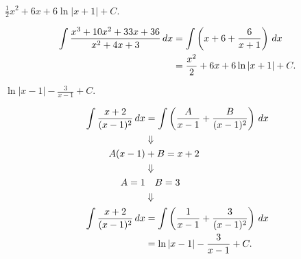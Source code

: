 

\everymath{\displaystyle}


    {$ \frac{1}{2}x^2 + 6x + 6 \ln |x+1| + C. $}
    
    \begin{align*}
        \int \frac{x^3+10x^2+33x+36}{x^2+4x+3} \, dx
            &= \int \left( x+6+\frac{6}{x+1} \right) \, dx \\
            &= \frac{x^2}{2} + 6x + 6 \ln|x+1| + C.
    \end{align*}
    
    {$ \ln|x-1| - \frac{3}{x-1} + C. $}
    
    \begin{align*}
        \int \frac{x+2}{(x-1)^2} \, dx
            &= \int \left( \frac{A}{x-1} + \frac{B}{(x-1)^2} \right) \, dx \\
            &\mathrel{\Downarrow} \\
        A(x-1) &+ B = x+2 \\
            &\mathrel{\Downarrow} \\
        A = 1 &\quad B = 3 \\
            &\mathrel{\Downarrow} \\
        \int \frac{x+2}{(x-1)^2} \, dx
            &= \int \left( \frac{1}{x-1} + \frac{3}{(x-1)^2} \right) \, dx \\
            &= \ln|x-1| - \frac{3}{x-1} + C.
    \end{align*}
    
    {}
    

